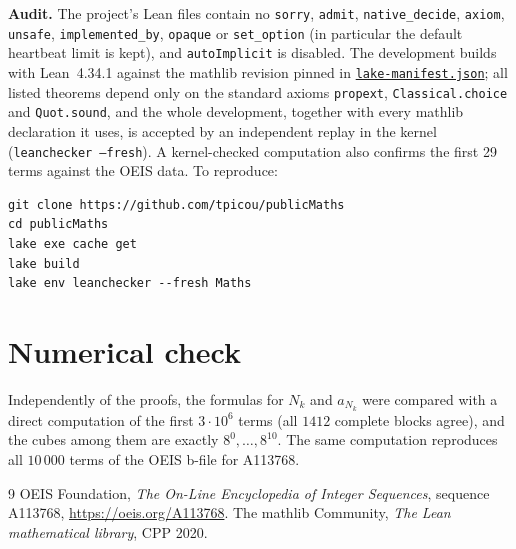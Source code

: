 \documentclass[11pt]{amsart}
\theoremstyle{remark}
\newcommand{\lean}[1]{\texttt{#1}}
\begin{document}
\smallskip
\noindent\textbf{Audit.} The project's Lean files contain no \lean{sorry}, \lean{admit},
\lean{native\_decide}, \lean{axiom}, \lean{unsafe}, \lean{implemented\_by}, \lean{opaque} or
\lean{set\_option} (in particular the default heartbeat limit is kept), and \lean{autoImplicit}
is disabled. The development builds with Lean~4.34.1 against the mathlib revision pinned in
\href{https://github.com/tpicou/publicMaths/blob/main/lake-manifest.json}{\texttt{lake-manifest.json}}; all listed theorems depend only on the standard axioms
\lean{propext}, \lean{Classical.choice} and \lean{Quot.sound}, and the whole development, together with every mathlib
declaration it uses, is accepted by an independent replay in the kernel
(\lean{leanchecker --fresh}). A kernel-checked computation also confirms the first 29 terms
against the OEIS data. To reproduce:
\begin{verbatim}
git clone https://github.com/tpicou/publicMaths
cd publicMaths
lake exe cache get
lake build
lake env leanchecker --fresh Maths
\end{verbatim}

\section*{Numerical check}
Independently of the proofs, the formulas for $N_k$ and $a_{N_k}$ were compared with a direct
computation of the first $3\cdot10^6$ terms (all $1412$ complete blocks agree), and the cubes
among them are exactly $8^0,\dots,8^{10}$. The same computation reproduces all $10\,000$ terms of
the OEIS b-file for A113768.

\begin{thebibliography}{9}
 OEIS Foundation, \emph{The On-Line Encyclopedia of Integer Sequences}, sequence
A113768, \url{https://oeis.org/A113768}.
 The mathlib Community, \emph{The Lean mathematical library}, CPP 2020.
\end{thebibliography}
\end{document}
